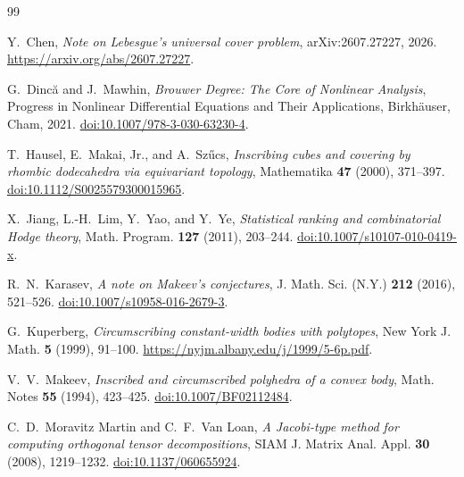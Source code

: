 \documentclass[11pt,reqno]{amsart}
\theoremstyle{definition}
\theoremstyle{remark}
\begin{document}
\begin{thebibliography}{99}

Y.~Chen,
\emph{Note on Lebesgue's universal cover problem},
arXiv:2607.27227, 2026.
\url{https://arxiv.org/abs/2607.27227}.

G.~Dinc{\u a} and J.~Mawhin,
\emph{Brouwer Degree: The Core of Nonlinear Analysis},
Progress in Nonlinear Differential Equations and Their Applications,
Birkh\"auser, Cham, 2021.
\href{https://doi.org/10.1007/978-3-030-63230-4}{doi:10.1007/978-3-030-63230-4}.

T.~Hausel, E.~Makai, Jr., and A.~Sz\H{u}cs,
\emph{Inscribing cubes and covering by rhombic dodecahedra via equivariant topology},
Mathematika \textbf{47} (2000), 371--397.
\href{https://doi.org/10.1112/S0025579300015965}{doi:10.1112/S0025579300015965}.

X.~Jiang, L.-H.~Lim, Y.~Yao, and Y.~Ye,
\emph{Statistical ranking and combinatorial Hodge theory},
Math. Program. \textbf{127} (2011), 203--244.
\href{https://doi.org/10.1007/s10107-010-0419-x}{doi:10.1007/s10107-010-0419-x}.

R.~N.~Karasev,
\emph{A note on Makeev's conjectures},
J. Math. Sci. (N.Y.) \textbf{212} (2016), 521--526.
\href{https://doi.org/10.1007/s10958-016-2679-3}{doi:10.1007/s10958-016-2679-3}.

G.~Kuperberg,
\emph{Circumscribing constant-width bodies with polytopes},
New York J. Math. \textbf{5} (1999), 91--100.
\url{https://nyjm.albany.edu/j/1999/5-6p.pdf}.

V.~V.~Makeev,
\emph{Inscribed and circumscribed polyhedra of a convex body},
Math. Notes \textbf{55} (1994), 423--425.
\href{https://doi.org/10.1007/BF02112484}{doi:10.1007/BF02112484}.

C.~D.~Moravitz Martin and C.~F.~Van Loan,
\emph{A Jacobi-type method for computing orthogonal tensor decompositions},
SIAM J. Matrix Anal. Appl. \textbf{30} (2008), 1219--1232.
\href{https://doi.org/10.1137/060655924}{doi:10.1137/060655924}.

\end{thebibliography}
\end{document}
